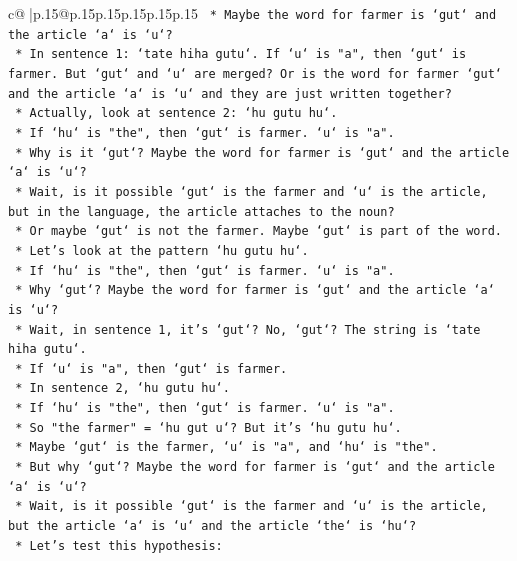 \documentclass{article}
\begin{document}
{\begin{supertabular}{c@{$\;$}|p{.15\linewidth}@{}p{.15\linewidth}p{.15\linewidth}p{.15\linewidth}p{.15\linewidth}p{.15\linewidth}}
{{{\texttt{            *   Maybe the word for farmer is `gut` and the article `a` is `u`?} \\
\texttt{            *   In sentence 1: `tate hiha gutu`. If `u` is "a", then `gut` is farmer. But `gut` and `u` are merged? Or is the word for farmer `gut` and the article `a` is `u` and they are just written together?} \\
\texttt{            *   Actually, look at sentence 2: `hu gutu hu`.} \\
\texttt{            *   If `hu` is "the", then `gut` is farmer. `u` is "a".} \\
\texttt{            *   Why is it `gut`? Maybe the word for farmer is `gut` and the article `a` is `u`?} \\
\texttt{            *   Wait, is it possible `gut` is the farmer and `u` is the article, but in the language, the article attaches to the noun?} \\
\texttt{            *   Or maybe `gut` is not the farmer. Maybe `gut` is part of the word.} \\
\texttt{            *   Let's look at the pattern `hu gutu hu`.} \\
\texttt{            *   If `hu` is "the", then `gut` is farmer. `u` is "a".} \\
\texttt{            *   Why `gut`? Maybe the word for farmer is `gut` and the article `a` is `u`?} \\
\texttt{            *   Wait, in sentence 1, it's `gut`? No, `gut`? The string is `tate hiha gutu`.} \\
\texttt{            *   If `u` is "a", then `gut` is farmer.} \\
\texttt{            *   In sentence 2, `hu gutu hu`.} \\
\texttt{            *   If `hu` is "the", then `gut` is farmer. `u` is "a".} \\
\texttt{            *   So "the farmer" = `hu gut u`? But it's `hu gutu hu`.} \\
\texttt{            *   Maybe `gut` is the farmer, `u` is "a", and `hu` is "the".} \\
\texttt{            *   But why `gut`? Maybe the word for farmer is `gut` and the article `a` is `u`?} \\
\texttt{            *   Wait, is it possible `gut` is the farmer and `u` is the article, but the article `a` is `u` and the article `the` is `hu`?} \\
\texttt{            *   Let's test this hypothesis:} \\
}}}
\end{supertabular}}
\end{document}

